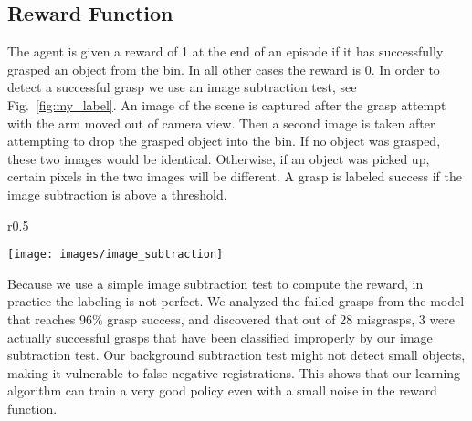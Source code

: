 \documentclass{article}
\begin{document}
\subsection{Reward Function}
The agent is given a reward of 1 at the end of an episode if it has successfully grasped an object from the bin. In all other cases the reward is 0. In order to detect a successful grasp we use an image subtraction test, see Fig.~\ref{fig:my_label}. An image of the scene is captured after the grasp attempt with the arm moved out of camera view. Then a second image is taken after attempting to drop the grasped object into the bin. If no object was grasped, these two images would be identical. Otherwise, if an object was picked up, certain pixels in the two images will be different. A grasp is labeled success if the image subtraction is above a threshold.

\begin{wrapfigure}{r}{0.5\textwidth}
\vspace{-0.5cm}
\begin{center}
\texttt{[image: images/image\_subtraction]}
\end{center}
\vspace{-0.35cm}
\caption{Grasp success is determined by subtracting images before an object is dropped into the bin (left) and after it was dropped (right).}
\label{fig:my_label}
\vspace{-0.2cm}
\end{wrapfigure}

Because we use a simple image subtraction test to compute the reward, in practice the labeling is not perfect. We analyzed the failed grasps from the model that reaches 96\% grasp success, and discovered that out of 28 misgrasps, 3 were actually successful grasps that have been classified improperly by our image subtraction test. Our background subtraction test might not detect small objects, making it vulnerable to false negative registrations. This shows that our learning algorithm can train a very good policy even with a small noise in the reward function.
\end{document}
